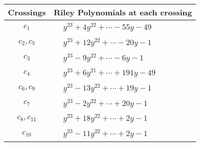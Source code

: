 \documentclass[1p]{elsarticle_modified}
\theoremstyle{definition}
\begin{document}
\begin{tabular}{m{50pt}|m{274pt}}
Crossings & \hspace{64pt}Riley Polynomials at each crossing \\
\hline $$\begin{aligned}c_{1}\end{aligned}$$&$\begin{aligned}
&y^{23}+4 y^{22}+\cdots-55 y-49
\end{aligned}$\\
\hline $$\begin{aligned}c_{2},c_{5}\end{aligned}$$&$\begin{aligned}
&y^{23}+12 y^{22}+\cdots-20 y-1
\end{aligned}$\\
\hline $$\begin{aligned}c_{3}\end{aligned}$$&$\begin{aligned}
&y^{23}-9 y^{22}+\cdots-6 y-1
\end{aligned}$\\
\hline $$\begin{aligned}c_{4}\end{aligned}$$&$\begin{aligned}
&y^{23}+6 y^{21}+\cdots+191 y-49
\end{aligned}$\\
\hline $$\begin{aligned}c_{6},c_{9}\end{aligned}$$&$\begin{aligned}
&y^{23}-13 y^{22}+\cdots+19 y-1
\end{aligned}$\\
\hline $$\begin{aligned}c_{7}\end{aligned}$$&$\begin{aligned}
&y^{23}-2 y^{22}+\cdots+20 y-1
\end{aligned}$\\
\hline $$\begin{aligned}c_{8},c_{11}\end{aligned}$$&$\begin{aligned}
&y^{23}+18 y^{22}+\cdots+2 y-1
\end{aligned}$\\
\hline $$\begin{aligned}c_{10}\end{aligned}$$&$\begin{aligned}
&y^{23}-11 y^{22}+\cdots+2 y-1
\end{aligned}$\\
\hline
\end{tabular}\\~\\
\end{document}
